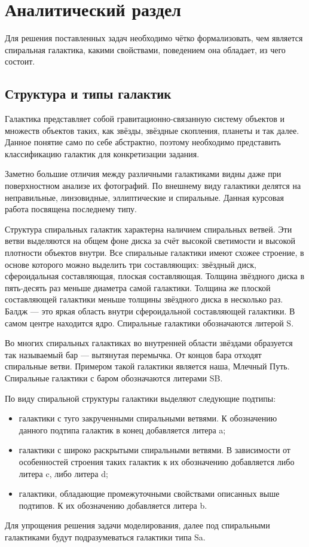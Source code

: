 \chapter{Аналитический раздел}
\label{cha:analysis}

Для решения поставленных задач необходимо чётко формализовать, чем является спиральная галактика, какими свойствами, поведением она обладает, из чего состоит.

\section{Структура и типы галактик}

Галактика представляет собой гравитационно-связанную систему объектов и множеств объектов таких, как звёзды, звёздные скопления, планеты и так далее. Данное понятие само по себе абстрактно, поэтому необходимо представить классификацию галактик для конкретизации задания.

Заметно большие отличия между различными галактиками видны даже при поверхностном анализе их фотографий. По внешнему виду галактики делятся на неправильные, линзовидные, эллиптические и спиральные\cite{konon}. Данная курсовая работа посвящена последнему типу.

Структура спиральных галактик характерна наличием спиральных ветвей. Эти ветви выделяются на общем фоне диска за счёт высокой светимости и высокой плотности объектов внутри. Все спиральные галактики имеют схожее строение, в основе которого можно выделить три составляющих: звёздный диск, сфероидальная составляющая, плоская составляющая. Толщина звёздного диска в пять-десять раз меньше диаметра самой галактики. Толщина же плоской составляющей галактики меньше толщины звёздного диска в несколько раз. Балдж — это яркая область внутри сфероидальной составляющей галактики. В самом центре находится ядро. Спиральные галактики обозначаются литерой S\cite{konon}.

Во многих спиральных галактиках во внутренней области звёздами образуется так называемый бар — вытянутая перемычка. От концов бара отходят спиральные ветви. Примером такой галактики является наша, Млечный Путь. Спиральные галактики с баром обозначаются литерами SB.

По виду спиральной структуры галактики выделяют следующие подтипы:
\begin{itemize}
    \item галактики с туго закрученными спиральными ветвями. К обозначению данного подтипа галактик в конец добавляется литера a;
    \item галактики с широко раскрытыми спиральными ветвями. В зависимости от особенностей строения таких галактик к их обозначению добавляется либо литера c, либо литера d;
    \item галактики, обладающие промежуточными свойствами описанных выше подтипов. К их обозначению добавляется литера b.
\end{itemize}
Для упрощения решения задачи моделирования, далее под спиральными галактиками будут подразумеваться галактики типа Sa.

